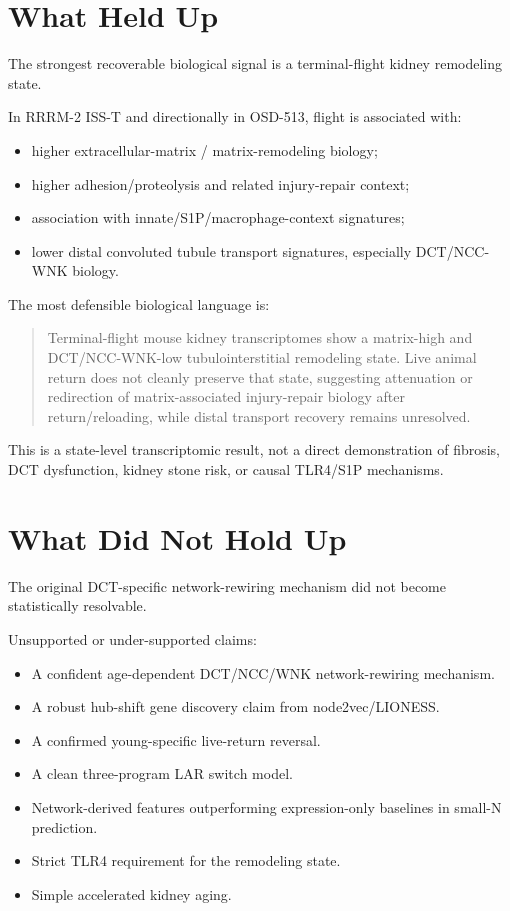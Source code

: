 \documentclass[11pt]{article}
\newcommand{\RRRM}{RRRM-2}
\newcommand{\DCT}{DCT/NCC-WNK}
\newcommand{\LAR}{LAR}
\newcommand{\ISS}{ISS-T}
\begin{document}
\section*{What Held Up}

The strongest recoverable biological signal is a terminal-flight kidney remodeling state.

In \RRRM{} \ISS{} and directionally in OSD-513, flight is associated with:

\begin{itemize}
  \item higher extracellular-matrix / matrix-remodeling biology;
  \item higher adhesion/proteolysis and related injury-repair context;
  \item association with innate/S1P/macrophage-context signatures;
  \item lower distal convoluted tubule transport signatures, especially \DCT{} biology.
\end{itemize}

The most defensible biological language is:

\begin{quote}
Terminal-flight mouse kidney transcriptomes show a matrix-high and DCT/NCC-WNK-low tubulointerstitial remodeling state. Live animal return does not cleanly preserve that state, suggesting attenuation or redirection of matrix-associated injury-repair biology after return/reloading, while distal transport recovery remains unresolved.
\end{quote}

This is a state-level transcriptomic result, not a direct demonstration of fibrosis, DCT dysfunction, kidney stone risk, or causal TLR4/S1P mechanisms.

\section*{What Did Not Hold Up}

The original DCT-specific network-rewiring mechanism did not become statistically resolvable.

Unsupported or under-supported claims:

\begin{itemize}
  \item A confident age-dependent DCT/NCC/WNK network-rewiring mechanism.
  \item A robust hub-shift gene discovery claim from node2vec/LIONESS.
  \item A confirmed young-specific live-return reversal.
  \item A clean three-program \LAR{} switch model.
  \item Network-derived features outperforming expression-only baselines in small-N prediction.
  \item Strict TLR4 requirement for the remodeling state.
  \item Simple accelerated kidney aging.
\end{itemize}
\end{document}
